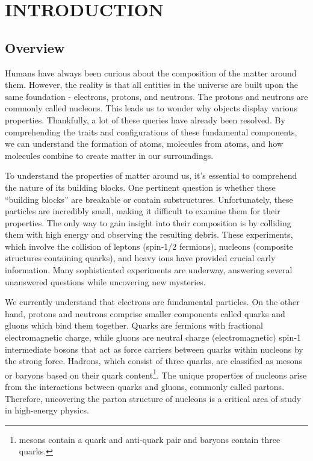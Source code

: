 \chapter{INTRODUCTION}

 \section{Overview}
 Humans have always been curious about the composition of the matter around them. However, the reality is that all entities in the universe are built upon the same foundation - electrons, protons, and neutrons. The protons and neutrons are commonly called nucleons. This leads us to wonder why objects display various properties. Thankfully, a lot of these queries have already been resolved. By comprehending the traits and configurations of these fundamental components, we can understand the formation of atoms, molecules from atoms, and how molecules combine to create matter in our surroundings.

 To understand the properties of matter around us, it's essential to comprehend the nature of its building blocks. One pertinent question is whether these ``building blocks'' are breakable or contain substructures. Unfortunately, these particles are incredibly small, making it difficult to examine them for their properties. The only way to gain insight into their composition is by colliding them with high energy and observing the resulting debris. These experiments, which involve the collision of leptons (spin-1/2 fermions), nucleons (composite structures containing quarks), and heavy ions have provided crucial early information. Many sophisticated experiments are underway, answering several unanswered questions while uncovering new mysteries. 

We currently understand that electrons are fundamental particles. On the other hand, protons and neutrons comprise smaller components called quarks and gluons which bind them together. Quarks are fermions with fractional electromagnetic charge, while gluons are neutral charge (electromagnetic) spin-1 intermediate bosons that act as force carriers between quarks within nucleons by the strong force. Hadrons, which consist of three quarks, are classified as mesons or baryons based on their quark content\footnote{mesons contain a quark and anti-quark pair and baryons contain three quarks.}. The unique properties of nucleons arise from the interactions between quarks and gluons, commonly called partons. Therefore, uncovering the parton structure of nucleons is a critical area of study in high-energy physics. 

